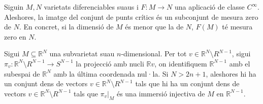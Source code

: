 \begin{teo}
    Siguin $M, N$ varietats diferenciables suaus i $F:M\to N$ una aplicació de classe $C^\infty$. Aleshores, la imatge del conjunt de punts crítics és un subconjunt de mesura zero de $N$. En concret, si la dimensió de $M$ és menor que la de $N$, $F(M)$ té mesura zero en $N$.
\end{teo}

\begin{lema}
    Sigui $M\subseteq\mathbb R^N$ una subvarietat suau $n$-dimensional. Per tot $v\in \mathbb R^N\setminus R^{N-1}$, sigui $\pi_v : \mathbb R^N\setminus R^{N-1}\to S^{N-1}$ la projecció amb nucli $\mathbb Rv$, on identifiquem $\mathbb R^{N-1}$ amb el subespai de $\mathbb R^N$ amb la última coordenada nul·la. Si $N>2n+1$, aleshores hi ha un conjunt dens de vectors $v\in \mathbb R^N\setminus R^{N-1}$ tals que hi ha un conjunt dens de vectors $v\in \mathbb R^N\setminus R^{N-1}$ tals que $\pi_v|_M$ és una immersió injectiva de $M$ en $\mathbb R^{N-1}$.
\end{lema}
